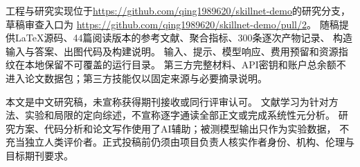 工程与研究实现位于\url{https://github.com/qing1989620/skillnet-demo}的研究分支，草稿审查入口为
\url{https://github.com/qing1989620/skillnet-demo/pull/2}。
随稿提供LaTeX源码、44篇阅读版本的参考文献、聚合指标、300条逐次产物记录、
构造输入与答案、出图代码及构建说明。
输入、提示、模型响应、费用预留和资源指纹在本地保留不可覆盖的运行目录。
第三方完整材料、API密钥和账户总余额不进入论文数据包；第三方技能仅以固定来源与必要摘录说明。

本文是中文研究稿，未宣称获得期刊接收或同行评审认可。
文献学习为针对方法、实验和局限的定向综述，不宣称逐字通读全部正文或完成系统性元分析。
研究方案、代码分析和论文写作使用了AI辅助；被测模型输出只作为实验数据，
不充当独立人类评价者。正式投稿前仍须由项目负责人核实作者身份、机构、伦理与目标期刊要求。
